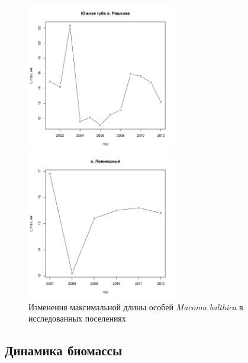 \documentclass[12pt, a4paper]{article}
\begin{document}
\begin{figure}[h]
\begin{minipage}[b]{.46\linewidth}
\begin{center}
\includegraphics[width=65mm]{../White_Sea/Ryashkov_YuG/L_max.pdf}
\end{center}
\end{minipage}
%
\hfil %
%
\begin{minipage}[b]{.46\linewidth}
\begin{center}
\includegraphics[width=65mm]{../White_Sea/Lomnishniy/L_max.pdf}
\end{center}
\end{minipage}



\caption{Изменения максимальной длины особей {\it Macoma balthica} в исследованных поселениях}
\label{ris:Length_max}
\end{figure}

\subsection{Динамика биомассы}
\end{document}
